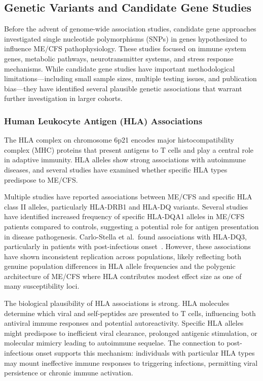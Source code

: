 \subsection{Genetic Variants and Candidate Gene Studies}
\label{sec:genetic-variants}

Before the advent of genome-wide association studies, candidate gene approaches investigated single nucleotide polymorphisms (SNPs) in genes hypothesized to influence ME/CFS pathophysiology. These studies focused on immune system genes, metabolic pathways, neurotransmitter systems, and stress response mechanisms. While candidate gene studies have important methodological limitations---including small sample sizes, multiple testing issues, and publication bias---they have identified several plausible genetic associations that warrant further investigation in larger cohorts.

\subsubsection{Human Leukocyte Antigen (HLA) Associations}

The HLA complex on chromosome 6p21 encodes major histocompatibility complex (MHC) proteins that present antigens to T cells and play a central role in adaptive immunity. HLA alleles show strong associations with autoimmune diseases, and several studies have examined whether specific HLA types predispose to ME/CFS.

Multiple studies have reported associations between ME/CFS and specific HLA class II alleles, particularly HLA-DRB1 and HLA-DQ variants. Several studies have identified increased frequency of specific HLA-DQA1 alleles in ME/CFS patients compared to controls, suggesting a potential role for antigen presentation in disease pathogenesis. Carlo-Stella et al.\ found associations with HLA-DQ3, particularly in patients with post-infectious onset~\cite{CarloStella2009}. However, these associations have shown inconsistent replication across populations, likely reflecting both genuine population differences in HLA allele frequencies and the polygenic architecture of ME/CFS where HLA contributes modest effect size as one of many susceptibility loci.

The biological plausibility of HLA associations is strong. HLA molecules determine which viral and self-peptides are presented to T cells, influencing both antiviral immune responses and potential autoreactivity. Specific HLA alleles might predispose to inefficient viral clearance, prolonged antigenic stimulation, or molecular mimicry leading to autoimmune sequelae. The connection to post-infectious onset supports this mechanism: individuals with particular HLA types may mount ineffective immune responses to triggering infections, permitting viral persistence or chronic immune activation.

